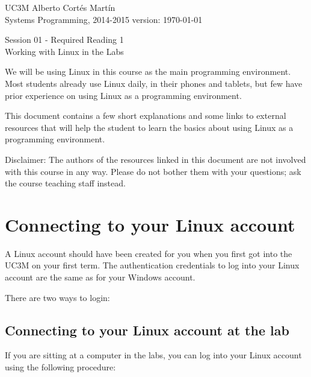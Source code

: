 \documentclass[a4paper, 12pt]{article}
\newcommand{\realtitle}{Session 01 - Required Reading 1}
\begin{document}
\makebox[\linewidth]{\rule{\textwidth}{0.4pt}}
UC3M \hfill Alberto Cortés Martín\\
Systems Programming, 2014-2015 \hfill version: \today\\
\makebox[\linewidth]{\rule{\textwidth}{0.4pt}}
\begin{center}
  \Large{\realtitle}\\Working with Linux in the Labs
\end{center}
\makebox[\linewidth]{\rule{\textwidth}{0.4pt}}
\vspace{0.5cm}

\tableofcontents
\vspace{1cm}

We will be using Linux in this course as the main programming environment.
Most students already use Linux daily, in their phones and tablets, but few
have prior experience on using Linux as a programming environment.

This document contains a few short explanations and some links to external
resources that will help the student to learn the basics about using Linux as a
programming environment.

Disclaimer: The authors of the resources linked in this document are not
involved with this course in any way. Please do not bother them with your
questions; ask the course teaching staff instead.

\section{Connecting to your Linux account}

A Linux account should have been created for you when you first got into the
UC3M on your first term.  The authentication credentials to log into your Linux
account are the same as for your Windows account.

There are two ways to login:

\subsection{Connecting to your Linux account at the lab}

  If you are sitting at a computer in the labs, you can log into your Linux
  account using the following procedure:
\end{document}
